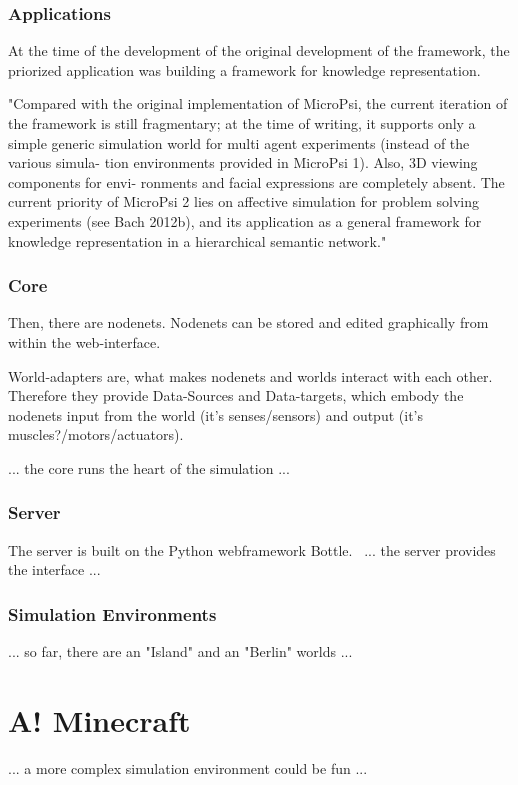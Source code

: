            \subsubsection{Applications}
At the time of the development of the original development of the framework, the priorized application was building a framework for knowledge representation.~\cite{conf/agi/Bach12}

"Compared with the original implementation of MicroPsi, the current iteration of the framework is still fragmentary; at the time of writing, it supports only a simple generic simulation world for multi agent experiments (instead of the various simula- tion environments provided in MicroPsi 1). Also, 3D viewing components for envi- ronments and facial expressions are completely absent.
The current priority of MicroPsi 2 lies on affective simulation for problem solving experiments (see Bach 2012b), and its application as a general framework for knowledge representation in a hierarchical semantic network."~\cite{conf/agi/Bach12}


            \subsubsection{Core}
Then, there are nodenets. Nodenets can be stored and edited graphically from within the web-interface.

World-adapters are, what makes nodenets and worlds interact with each other. Therefore they provide Data-Sources and Data-targets, which embody the nodenets input from the world (it's senses/sensors) and output (it's muscles?/motors/actuators).

... the core runs the heart of the simulation ...

            \subsubsection{Server}
The server is built on the Python webframework Bottle.~\cite{conf/agi/Bach12}
... the server provides the interface ...

            \subsubsection{Simulation Environments}
... so far, there are an "Island" and an "Berlin" worlds ...

    \section{A! Minecraft}
... a more complex simulation environment could be fun ...

